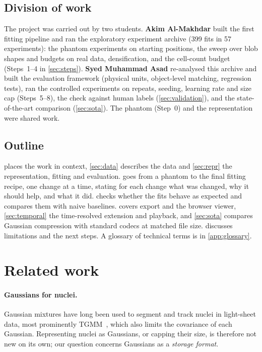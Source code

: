 \documentclass[
  paper=a4,
  fontsize=11pt,
  english,
  numbers=noenddot,
  parskip=half,
  cdgeometry=symmetric,
  cd=barcolor,
  cdfont=false
]{tudscrartcl}
\begin{document}
\subsection{Division of work}

The project was carried out by two students. \textbf{Akim Al-Makhdar} built the first fitting pipeline
and ran the exploratory experiment archive (399 fits in 57 experiments): the phantom
experiments on starting positions, the sweep over blob shapes and budgets on real data,
densification, and the cell-count budget (Steps~1--4 in \cref{sec:steps}). \textbf{Syed
Muhammad Asad} re-analysed this archive and built the evaluation framework (physical units,
object-level matching, regression tests), ran the controlled experiments on repeats, seeding,
learning rate and size cap (Steps~5--8), the check against human labels (\cref{sec:validation}),
and the state-of-the-art comparison (\cref{sec:sota}). The phantom (Step~0) and the
representation were shared work.

\subsection{Outline}

 places the work in context, \cref{sec:data} describes the data and
\cref{sec:repr} the representation, fitting and evaluation.  goes from a
phantom to the final fitting recipe, one change at a time, stating for each change what was
changed, why it should help, and what it did.  checks whether the fits
behave as expected and compares them with naive baselines.  covers export
and the browser viewer, \cref{sec:temporal} the time-resolved extension and playback, and
\cref{sec:sota} compares Gaussian compression with standard codecs at matched file size.
discusses limitations and the next steps. A glossary of technical terms is in
\cref{app:glossary}.

\section{Related work}\label{sec:related}

\paragraph{Gaussians for nuclei.} Gaussian mixtures have long been used to segment and track
nuclei in light-sheet data, most prominently TGMM~\cite{amat2014fast}, which also limits the
covariance of each Gaussian. Representing nuclei as Gaussians, or capping their size, is
therefore not new on its own; our question concerns Gaussians as a \emph{storage format}.
\end{document}
